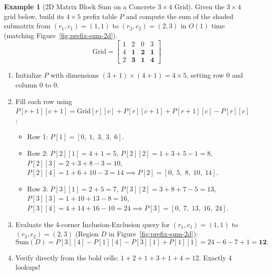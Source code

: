 \documentclass[11pt,a4paper]{article}
\theoremstyle{definition}
\newtheorem{example}{Example}[section]
\begin{document}
\begin{example}[2D Matrix Block Sum on a Concrete $3 \times 4$ Grid]
Given the $3 \times 4$ grid below, build its $4 \times 5$ prefix table $P$ and compute the sum of the shaded submatrix from $(r_1, c_1) = (1, 1)$ to $(r_2, c_2) = (2, 3)$ in $O(1)$ time (matching Figure~\ref{fig:prefix-sum-2d}).
\[
    \text{Grid} = \begin{bmatrix} 1 & 2 & 0 & 3 \\ 4 & \mathbf{1} & \mathbf{2} & \mathbf{1} \\ 2 & \mathbf{3} & \mathbf{1} & \mathbf{4} \end{bmatrix}
\]
\begin{enumerate}
    \item Initialize $P$ with dimensions $(3 + 1) \times (4 + 1) = 4 \times 5$, setting row $0$ and column $0$ to $0$.
    \item Fill each row using $P[r+1][c+1] = \text{Grid}[r][c] + P[r][c+1] + P[r+1][c] - P[r][c]$:
    \begin{itemize}
        \item Row 1: $P[1] = [0,\; 1,\; 3,\; 3,\; 6]$.
        \item Row 2: $P[2][1] = 4 + 1 = 5$,\; $P[2][2] = 1 + 3 + 5 - 1 = 8$,\; $P[2][3] = 2 + 3 + 8 - 3 = 10$,\; $P[2][4] = 1 + 6 + 10 - 3 = 14 \implies P[2] = [0,\; 5,\; 8,\; 10,\; 14]$.
        \item Row 3: $P[3][1] = 2 + 5 = 7$,\; $P[3][2] = 3 + 8 + 7 - 5 = 13$,\; $P[3][3] = 1 + 10 + 13 - 8 = 16$,\; $P[3][4] = 4 + 14 + 16 - 10 = 24 \implies P[3] = [0,\; 7,\; 13,\; 16,\; 24]$.
    \end{itemize}
    \item Evaluate the 4-corner Inclusion-Exclusion query for $(r_1, c_1) = (1, 1)$ to $(r_2, c_2) = (2, 3)$ (Region $D$ in Figure~\ref{fig:prefix-sum-2d}):
    \[
        \text{Sum}(D) = P[3][4] - P[1][4] - P[3][1] + P[1][1] = 24 - 6 - 7 + 1 = \mathbf{12}.
    \]
    \item Verify directly from the bold cells: $1 + 2 + 1 + 3 + 1 + 4 = 12$. Exactly 4 lookups!
\end{enumerate}
\end{example}
\end{document}
